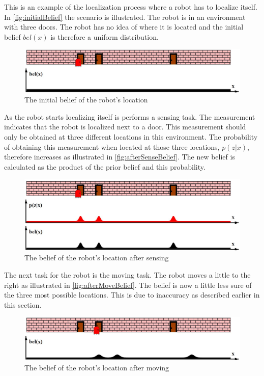 This is an example of the localization process where a robot has to localize itself. In \autoref{fig:initialBelief} the scenario is illustrated. The robot is in an environment with three doors. The robot has no idea of where it is located and the initial belief $bel(x)$ is therefore a uniform distribution.

\begin{figure}[H]
\centering
\includegraphics[scale=0.36]{images/MarkovLocalizationA}
\caption{The initial belief of the robot's location}
\label{fig:initialBelief}
\end{figure}

As the robot starts localizing itself is performs a sensing task. The measurement indicates that the robot is localized next to a door. This measurement should only be obtained at three different locations in this environment. The probability of obtaining this measurement when located at those three locations, $p(z|x)$, therefore increases as illustrated in \autoref{fig:afterSenseBelief}. The new belief is calculated as the product of the prior belief and this probability.

\begin{figure}[H]
\centering
\includegraphics[scale=0.36]{images/MarkovLocalizationB}
\caption{The belief of the robot's location after sensing}
\label{fig:afterSenseBelief}
\end{figure}

The next task for the robot is the moving task. The robot moves a little to the right as illustrated in \autoref{fig:afterMoveBelief}. The belief is now a little less sure of the three most possible locations. This is due to inaccuracy as described earlier in this section.

\begin{figure}[H]
\centering
\includegraphics[scale=0.36]{images/MarkovLocalizationC}
\caption{The belief of the robot's location after moving}
\label{fig:afterMoveBelief}
\end{figure}

